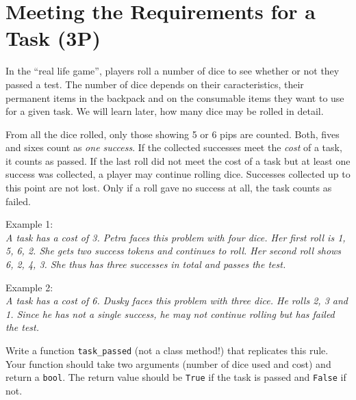 \documentclass[
	english,
	fontsize=10pt,
	parskip=half,
	titlepage=true,
	DIV=12
]{scrartcl}
\newcommand*{\inPy}[1]{\texttt{#1}}
\begin{document}
\section{Meeting the Requirements for a Task (3\;P)}
In the \enquote{real life game}, players roll a number of dice to see whether or not they passed a test. The number of dice depends on their caracteristics, their permanent items in the backpack and on the consumable items they want to use for a given task. We will learn later, how many dice may be rolled in detail.

From all the dice rolled, only those showing 5 or 6 pips are counted. Both, fives and sixes count as \emph{one success}. If the collected successes meet the \emph{cost} of a task, it counts as passed. If the last roll did not meet the cost of a task but at least one success was collected, a player may continue rolling dice. Successes collected up to this point are not lost. Only if a roll gave no success at all, the task counts as failed.

Example 1:\\
\emph{A task has a cost of 3. Petra faces this problem with four dice. Her first roll is 1, 5, 6, 2. She gets two success tokens and continues to roll. Her second roll shows 6, 2, 4, 3. She thus has three successes in total and passes the test.}

Example 2:\\
\emph{A task has a cost of 6. Dusky faces this problem with three dice. He rolls 2, 3 and 1. Since he has not a single success, he may not continue rolling but has failed the test.}

Write a function \texttt{task\_passed} (not a class method!) that replicates this rule. Your function should take two arguments (number of dice used and cost) and return a \inPy{bool}. The return value should be \inPy{True} if the task is passed and \inPy{False} if not.
\end{document}
